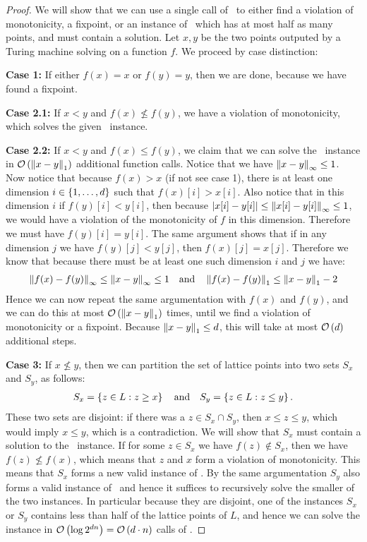 \begin{proof}
    We will show that we can use a single call of \Tarskistar\ to either find a violation of monotonicity, a fixpoint, or an instance of \Tarski\ which has at most half as many points, and must contain a solution. Let $x, y$ be the two points outputed by a Turing machine solving \Tarskistar on a function $f$. We proceed by case distinction:

    \textbf{Case 1:} If either $f(x) = x$ or $f(y) = y$, then we are done, because we have found a fixpoint.

    \textbf{Case 2.1:} If $x < y$ and $f(x) \not\leq f(y)$, we have a violation of monotonicity, which solves the given \Tarski\ instance.

    \textbf{Case 2.2:} If $x < y$ and $f(x) \leq f(y)$, we claim that we can solve the \Tarski\ instance in $\mathcal{O}\left(\left\lVert x - y\right\rVert_{1}\right)$ additional function calls. Notice that we have $\left\lVert x-y\right\rVert_{\infty} \leq 1$. Now notice that because $f(x) > x$ (if not see case 1), there is at least one dimension $i \in \left\{1, \dots, d\right\}$ such that $f(x)[i] > x[i]$. Also notice that in this dimension $i$ if $f(y)[i] < y[i]$, then because $\left\lvert x[i] - y[i]\right\rvert \leq \left\lVert x[i] - y[i]\right\rVert_{\infty} \leq 1$, we would have a violation of the monotonicity of $f$ in this dimension. Therefore we must have $f(y)[i] = y[i]$. The same argument shows that if in any dimension $j$ we have $f(y)[j] < y[j]$, then $f(x)[j] = x[j]$. Therefore we know that because there must be at least one such dimension $i$ and $j$ we have:
    \begin{align*}
        \left\lVert f(x) - f(y)\right\rVert_{\infty} \leq \left\lVert x - y\right\rVert_{\infty} \leq 1 \quad \text{and} \quad \left\lVert f(x) - f(y)\right\rVert_{1} \leq \left\lVert x - y\right\rVert_{1} - 2
    \end{align*}
    Hence we can now repeat the same argumentation with $f(x)$ and $f(y)$, and we can do this at most $\mathcal{O}\left(\left\lVert x - y\right\rVert_{1}\right)$ times, until we find a violation of monotonicity or a fixpoint. Because $\left\lVert x - y\right\rVert_{1} \leq d$, this will take at most $\mathcal{O}\left(d\right)$ additional steps.

    \textbf{Case 3:} If $x \not\leq y$, then we can partition the set of lattice points into two sets $S_x$ and $S_y$, as follows:
    \begin{align*}
        S_x = \left\{z \in L : z \geq x\right\} \quad \text{and} \quad S_y = \left\{z \in L : z \leq y\right\}.
    \end{align*}
    These two sets are disjoint: if there was a $z \in S_x \cap S_y$, then $x \leq z \leq y$, which would imply $x \leq y$, which is a contradiction. We will show that $S_x$ must contain a solution to the \Tarski\ instance.
    If for some $z \in S_x$ we have $f(z) \not\in S_x$, then we have $f(z) \not\leq f(x)$, which means that $z$ and $x$ form a violation of monotonicity. This means that $S_x$ forms a new valid instance of \Tarski. By the same argumentation $S_y$ also forms a valid instance of \Tarski\ and hence it suffices to recursively solve the smaller of the two instances. In particular because they are disjoint, one of the instances $S_x$ or $S_y$ contains less than half of the lattice points of $L$, and hence we can solve the instance in $\mathcal{O}\left(\log{2^{dn}}\right) = \mathcal{O}\left(d \cdot n\right)$ calls of \Tarskistar.
\end{proof}

